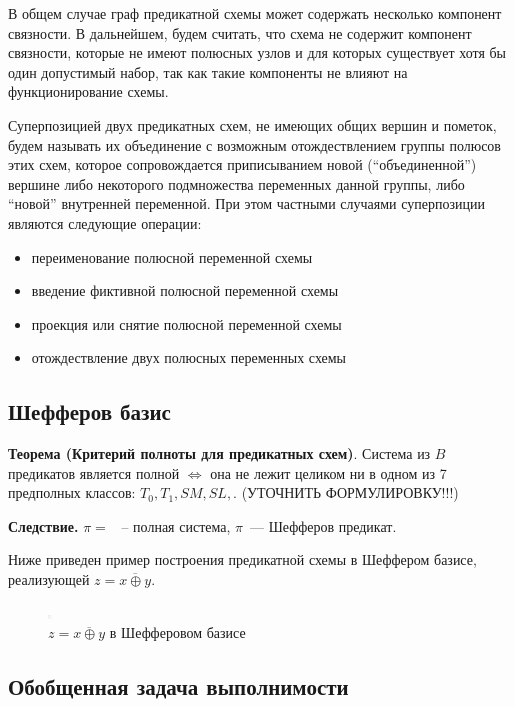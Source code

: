 \documentclass[12pt]{article}
\begin{document}
В общем случае граф предикатной схемы может содержать несколько компонент связности. 
В дальнейшем, будем считать, что схема не содержит компонент связности, 
которые не имеют полюсных узлов и для которых существует хотя бы один допустимый набор, так как такие компоненты не влияют на функционирование схемы.

Суперпозицией двух предикатных схем, не имеющих общих вершин и пометок, 
будем называть их объединение с возможным отождествлением группы полюсов этих схем, 
которое сопровождается приписыванием новой (``объединенной'') вершине либо 
некоторого подмножества переменных данной группы, либо ``новой'' внутренней переменной.
 При этом частными случаями суперпозиции являются следующие операции:
\begin{itemize}
\item переименование полюсной переменной схемы

\item введение фиктивной полюсной переменной схемы

\item проекция или снятие полюсной переменной схемы

\item отождествление двух полюсных переменных схемы
\end{itemize}

\subsection{Шефферов базис}

\textbf{Теорема (Критерий полноты для предикатных схем)}. Система из $B$ предикатов является полной $\iff$
она не лежит целиком ни в одном из 7 предполных классов: $T_0, T_1, SM, SL, $. \cite{Shu11} (УТОЧНИТЬ ФОРМУЛИРОВКУ!!!)

\textbf{Следствие.} $\pi =  $ ~-- полная система, $\pi$~--- Шефферов предикат.

Ниже приведен пример построения предикатной схемы в Шеффером базисе, реализующей $z=\overline{x \oplus y}$.

\begin{figure}[htb]
\centering
\includegraphics[width=0.01\textwidth]{constraint_graph.png}
\caption{$z=\overline{x \oplus y}$ в Шефферовом базисе}
\label{fig:sheff}
\end{figure}

\subsection{Обобщенная задача выполнимости}
\end{document}
